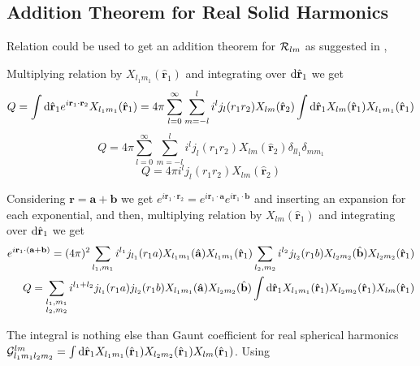 \subsection{Addition Theorem for Real Solid Harmonics}
\par{Relation  could be used to get an addition theorem for
  $\mathcal{R}_{lm}$ as suggested in \citep{Chakrabarti95},\citep{Deb83}}
\par{Multiplying relation  by $X_{l_1m_1}(\hat{\bm{r}}_1)$ and
  integrating over $\text{d} \hat{{\bf r}}_1$ we get}
\begin{equation*}
Q=\int \text{d} \hat{{\bf r}}_1
e^{i{\bf r}_1\cdot{\bf r}_2}X_{l_1m_1}(\hat{{\bf r}}_1)=4\pi\sum_{l=0}^{\infty}\sum_{m=-l}^{l}i^lj_l(r_1r_2)X_{lm}(\hat{{\bf r}}_2)\int \text{d} \hat{{\bf r}}_1
X_{lm}(\hat{{\bf r}}_1)X_{l_1m_1}(\hat{{\bf r}}_1)
\end{equation*}
\begin{equation*}
Q=4\pi\sum_{l=0}^{\infty}\sum_{m=-l}^{l}i^lj_l(r_1r_2)X_{lm}(\hat{\bm{r}}_2)\delta_{ll_1}\delta_{mm_1}
\end{equation*}
\begin{equation}
\label{part1}
Q=4\pi i^lj_l(r_1r_2)X_{lm}(\hat{\bm{r}}_2)
\end{equation}
\par{Considering $\bm{r}=\bm{a}+\bm{b}$ we get
$e^{i\bm{r}_1\cdot\bm{r}_2}=e^{i\bm{r}_1\cdot\bm{a}}e^{i\bm{r}_1\cdot\bm{b}}$
and inserting an expansion  for each exponential, and then,
multiplying relation by $X_{lm}(\hat{\bm{r}}_1)$ and integrating over $\text{d} \hat{{\bf r}}_1$ we get}
\begin{equation*}
\begin{split}
e^{i{\bf r}_1\cdot({\bf a}+{\bf b})}=(4\pi)^2\sum_{l_1,m_1}i^{l_1}j_{l_1}(r_1a)X_{l_1m_1}(\hat{{\bf a}})X_{l_1m_1}(\hat{{\bf r}}_1)\sum_{l_2,m_2}i^{l_2}j_{l_2}(r_1b)X_{l_2m_2}(\hat{{\bf b}})X_{l_2m_2}(\hat{{\bf r}}_1)\\
Q=\sum_{\begin{subarray}{l}l_1,m_1\\
l_2,m_2
\end{subarray}
}i^{l_1+l_2}j_{l_1}(r_1a)j_{l_2}(r_1b)X_{l_1m_1}(\hat{{\bf a}})X_{l_2m_2}(\hat{{\bf b}})\int
\text{d} \hat{{\bf r}}_1 X_{l_1m_1}(\hat{{\bf r}}_1)X_{l_2m_2}(\hat{{\bf r}}_1)X_{lm}(\hat{{\bf r}}_1)
\end{split}
\end{equation*}
\par{The integral is nothing else than Gaunt coefficient for real spherical
  harmonics $\mathcal{G}_{l_1m_1l_2m_2}^{lm}=\int \text{d} \hat{{\bf r}}_1
  X_{l_1m_1}(\hat{{\bf r}}_1)X_{l_2m_2}(\hat{{\bf r}}_1)X_{lm}(\hat{{\bf r}}_1)$.
  Using }
